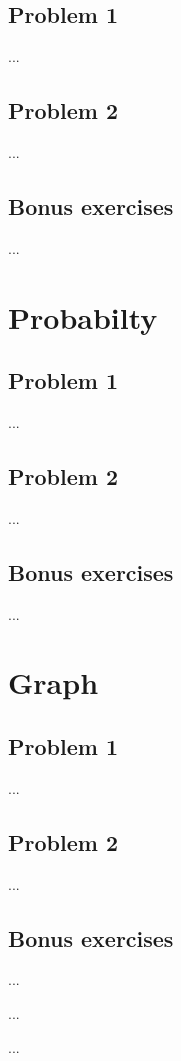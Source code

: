 \documentclass[a4paper]{article}
\begin{document}
\subsection{Problem 1}
...

\subsection{Problem 2}
...

\subsection{Bonus exercises}
...

\section{Probabilty}
\subsection{Problem 1}
...

\subsection{Problem 2}
...

\subsection{Bonus exercises}
...



\section{Graph}
\subsection{Problem 1}
...

\subsection{Problem 2}
...

\subsection{Bonus exercises}
...

\begin{thebibliography}{80}


  ...


  ...


\end{thebibliography}
\end{document}
